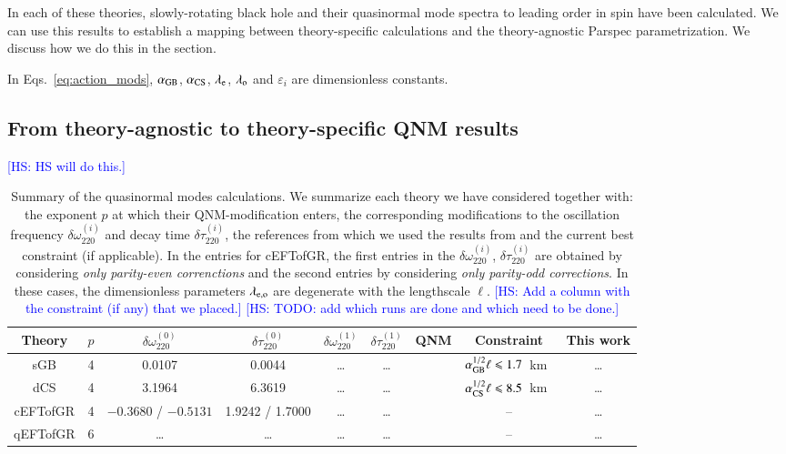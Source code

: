 \documentclass[twocolumn,prd,aps,superscriptaddress,preprintnumbers,tightenlines,showpacs,nofootinbib,eqsecnum,amsfonts,amsmath,longbibliography]{revtex4-2}
\newcommand{\lame}{\lambda_{\rm e}}
\newcommand{\lamo}{\lambda_{\rm o}}
\newcommand{\hs}[1]{{\textcolor{blue}{{[HS: #1]}} }}
\begin{document}
In each of these theories, slowly-rotating black hole and their quasinormal mode spectra
to leading order in spin have been calculated.
%
We can use this results to establish a mapping between theory-specific calculations and
the theory-agnostic {\sc Parspec} parametrization.
%
We discuss how we do this in the section.

In Eqs.~\eqref{eq:action_mods}, $\alpha_{\rm GB}$, $\alpha_{\rm CS}$, $\lame$,
$\lamo$ and $\varepsilon_{i}$ are dimensionless constants.


\subsection{From theory-agnostic to theory-specific QNM results}

\hs{HS will do this.}

\begin{table*}[th]
\begin{tabular}{c | c c c c c c c c}
\hline
\hline
Theory & $p$ & $\delta \omega^{(0)}_{220}$ & $\delta \tau^{(0)}_{220}$ & $\delta \omega^{(1)}_{220}$ & $\delta \tau^{(1)}_{220}$ & QNM & Constraint & This work \\
\hline
sGB      & 4 & 0.0107 & 0.0044 & \dots & \dots & \cite{Pierini:2021jxd} & $\alpha^{1/2}_{\rm GB} \ell \leqslant 1.7$~km~\cite{Perkins:2021mhb} & \dots \\
dCS      & 4 & 3.1964 & 6.3619 & \dots & \dots &  \cite{Wagle:2021tam} & $\alpha^{1/2}_{\rm CS} \ell \leqslant 8.5$~km~\cite{Silva:2020acr} & \dots \\
cEFTofGR & 4 & $-0.3680$ / $-0.5131$  & 1.9242 / 1.7000 & \dots & \dots & \cite{Cano:2021myl} & --  & \dots \\
qEFTofGR & 6 & \dots & \dots & \dots & \dots & \cite{Cano:2021myl} & --  & \dots \\
\hline
\hline
\end{tabular}
\caption{Summary of the quasinormal modes calculations.
%
We summarize each theory we have considered together with: the exponent $p$ at
which their QNM-modification enters, the corresponding modifications to the
oscillation frequency $\delta \omega^{(i)}_{220}$ and decay time $\delta \tau^{(i)}_{220}$, the
references from which we used the results from and the current best constraint
(if applicable).
%
In the entries for cEFTofGR, the first entries in the $\delta
\omega^{(i)}_{220}$, $\delta \tau^{(i)}_{220}$ are obtained by considering
\emph{only parity-even correnctions} and the second entries by considering
\emph{only parity-odd corrections}. In these cases, the dimensionless parameters
$\lambda_{\rm e,o}$ are degenerate with the lengthscale $\ell$.
%
\hs{Add a column with the constraint (if any) that we placed.}
\hs{TODO: add which runs are done and which need to be done.}
}
\label{tab:ref_theories_qnms}
\end{table*}
\end{document}
